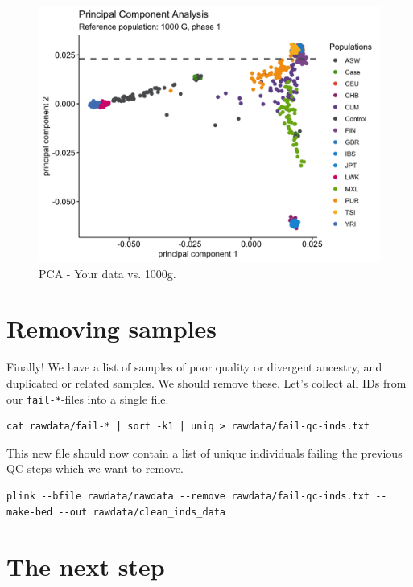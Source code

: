 \documentclass[
]{book}
\begin{document}
\begin{figure}

{\centering \includegraphics[width=18.67in]{img/_gwas/pca-1000g} 

}

\caption{PCA - Your data vs. 1000g.}\label{fig:show-pca-1000g}
\end{figure}

\hypertarget{removing-samples}{%
\section{Removing samples}\label{removing-samples}}

Finally! We have a list of samples of poor quality or divergent ancestry, and duplicated or related samples. We should remove these. Let's collect all IDs from our \texttt{fail-*}-files into a single file.

\begin{verbatim}
cat rawdata/fail-* | sort -k1 | uniq > rawdata/fail-qc-inds.txt
\end{verbatim}

This new file should now contain a list of unique individuals failing the previous QC steps which we want to remove.

\begin{verbatim}
plink --bfile rawdata/rawdata --remove rawdata/fail-qc-inds.txt --make-bed --out rawdata/clean_inds_data
\end{verbatim}

\hypertarget{the-next-step}{%
\section{The next step}\label{the-next-step}}
\end{document}
